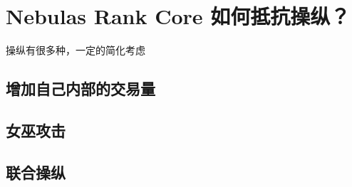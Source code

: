 \section{Nebulas Rank Core 如何抵抗操纵？}
操纵有很多种，一定的简化考虑

\subsection{增加自己内部的交易量}
\subsection{女巫攻击}
\subsection{联合操纵}
